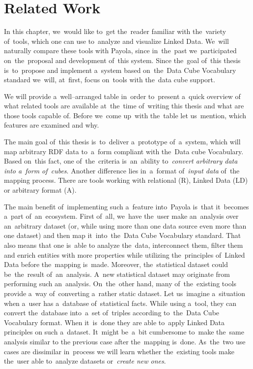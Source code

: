 \chapter{Related Work}
\label{chap:rw}

In this chapter, we~would like to~get the~reader familiar with the~variety of~tools, which one can
use to~analyze and visualize Linked Data. We~will naturally compare these tools with
Payola, since in~the~past we~participated on~the~proposal and development of~this system.
Since the~goal of~this thesis is~to~propose and implement a~system based on~the~Data Cube Vocabulary
standard we~will, at~first, focus on~tools with the~data cube support. 

We will provide a~well--arranged table in~order to~present a~quick overview of
what related tools are available at~the~time of~writing this thesis and what are those 
tools capable of. Before we~come up~with the~table let us~mention, which
features are examined and why.

The main goal of~this thesis is~to~deliver a~prototype of~a~system, which will map 
arbitrary RDF data to~a~form compliant with the~Data cube Vocabulary. Based on~this fact, one of~the~criteria is~an~ability to~\emph{convert arbitrary data 
into a~form of~cubes}. Another difference lies in~a~format of~\emph{input data} of~the
mapping process. There are tools working with relational (R), Linked Data (LD) or
arbitrary format (A).

The main benefit of~implementing such a~feature into~Payola is~that it~becomes a~part of~an~ecosystem. First of~all, we~have the~user make an~analysis over an~arbitrary
dataset (or, while using more than one data source even more than one dataset)
and then map it~into~the~Data Cube Vocabulary standard. That also means that one is~able
to analyze the~data, interconnect them, filter them and enrich entities with more properties
while utilizing the~principles of~Linked Data before the~mapping is~made. Moreover, the~statistical
dataset could be~the~result of~an~analysis. A~new statistical dataset may originate from performing
such an~analysis. On~the~other hand, many of~the~existing 
tools provide a~way of~converting a~rather static dataset. Let us~imagine a~situation when a~user has a~database of~statistical facts. While using a~tool, they can 
convert the~database into~a~set of~triples according to~the~Data Cube 
Vocabulary format. When it~is~done they are able to~apply Linked Data principles
on such a~dataset. It~might be~a~bit cumbersome to~make the~same analysis similar to
the previous case after the~mapping is~done. As~the~two use cases are dissimilar in~process 
we will learn whether the~existing tools make the~user able to~analyze datasets or~\emph{create new ones}.

